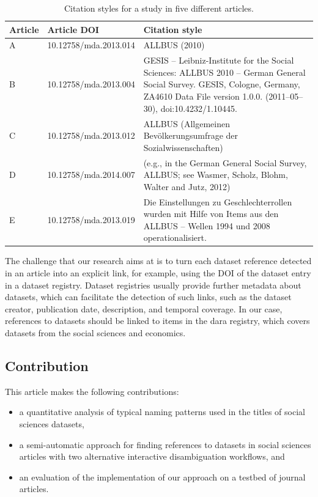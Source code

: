\documentclass{IOS-Book-Article}
\newcommand{\dara}{\textsf{da\textbar ra}}
\begin{document}
\begin{table}[h!]
	\renewcommand{\arraystretch}{2}
	\centering
	\begin{tabular}{p{.6cm}p{2.5cm}p{7.8cm}}
		\hline
		\bf Article &  \bf Article DOI & \bf Citation style \\
		\hline
		A  & 10.12758/mda.2013.014 &ALLBUS (2010)\\
		
		B  & 10.12758/mda.2013.004 &GESIS -- Leibniz-Institute for the Social Sciences: ALLBUS 2010 -- German General Social Survey. GESIS, Cologne, Germany, ZA4610 Data File version 1.0.0. (2011--05--30), doi:10.4232/1.10445. \\ 
		
		C & 10.12758/mda.2013.012 &ALLBUS (Allgemeinen Bev\"olkerungsumfrage der Sozialwissenschaften)\\
		
		D & 10.12758/mda.2014.007 &(e.g., in the German General Social Survey, ALLBUS; see Wasmer, Scholz, Blohm, Walter and Jutz, 2012)\\
		
		E & 10.12758/mda.2013.019 & Die Einstellungen zu Geschlechterrollen wurden mit Hilfe von Items aus den ALLBUS -- Wellen 1994 und 2008 operationalisiert.\\\hline
	\end{tabular}
	\caption{Citation styles for a study in five different articles.}
	\label{table:citation-variety}
\end{table}

The challenge that our research aims at is to turn each dataset reference detected in an article into an explicit link, for example, using the DOI of the dataset entry in a dataset registry. 
Dataset registries usually provide further metadata about datasets, which can facilitate the detection of such links, such as the dataset creator, publication date, description, and temporal coverage.
In our case, references to datasets should be linked to items in the {\dara} registry, which covers datasets from the social sciences and economics.

\subsection{Contribution}

This article makes the following contributions:
\begin{itemize}
\item a quantitative analysis of typical naming patterns used in the titles of social sciences datasets,
\item a semi-automatic approach for finding references to datasets in social sciences articles with two alternative interactive disambiguation workflows, and
\item an evaluation of the implementation of our approach on a testbed of journal articles.  
\end{itemize}
\end{document}
